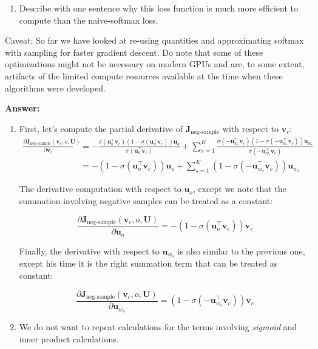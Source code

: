 \documentclass{article}
\newenvironment{answer}{
    {\bf Answer:} \sf \begingroup\color{red}
}{\endgroup}%
\begin{document}
\begin{enumerate}[label=(\alph*)]
\begin{enumerate}[label=(\roman*)]
\item Describe with one sentence why this loss function is much more efficient to compute than the naive-softmax loss.
\end{enumerate}

Caveat: So far we have looked at re-using quantities and approximating softmax with sampling for faster gradient descent. Do note that some of these optimizations might not be necessary on modern GPUs and are, to some extent, artifacts of the limited compute resources available at the time when these algorithms were developed.

\begin{shaded}
\begin{answer}
\begin{enumerate}[label=(\roman*)]
\item First, let's compute the partial derivative of $\bm J_{\text{neg-sample}}$ with respect to $\bm v_c$:
\begin{align}
    \frac{\partial \bm J_{\text{neg-sample}}(\bm v_c, o, \bm U)}{\partial \bm v_c} &= -\frac{\sigma(\bm u_o^{\top}\bm v_c)(1-\sigma(\bm u_o^{\top}\bm v_c))\bm u_o}{\sigma(\bm u_o^{\top}\bm v_c)} + \sum_{s=1}^{K}\frac{\sigma(-\bm u_{w_s}^{\top}\bm v_c)(1-\sigma(-\bm u_{w_s}^{\top}\bm v_c))\bm u_{w_s}}{\sigma(-\bm u_{w_s}^{\top}\bm v_c)} \\
    &= -(1-\sigma(\bm u_o^{\top}\bm v_c))\bm u_o + \sum_{s=1}^{K} (1-\sigma(-\bm u_{w_s}^{\top}\bm v_c))\bm u_{w_s}
\end{align}

The derivative computation with respect to $\bm u_o$, except we note that the summation involving negative samples can be treated as a constant:

\begin{equation}
    \frac{\partial \bm J_{\text{neg-sample}}(\bm v_c, o, \bm U)}{\partial \bm u_o} = -(1-\sigma(\bm u_o^{\top}\bm v_c))\bm v_c
\end{equation}

Finally, the derivative with respect to $\bm u_{w_s}$ is also similar to the previous one, except his time it is the right summation term that can be treated as constant:

\begin{equation}\label{wrtuwx}
    \frac{\partial \bm J_{\text{neg-sample}}(\bm v_c, o, \bm U)}{\partial \bm u_{w_s}} = (1-\sigma(-\bm u_{w_s}^{\top}\bm v_c))\bm v_c
\end{equation}

\item \color{red} We do not want to repeat calculations for the terms involving \textit{sigmoid} and inner product calculations. 


\end{enumerate}
\end{answer}
\end{shaded}
\end{enumerate}
\end{document}
